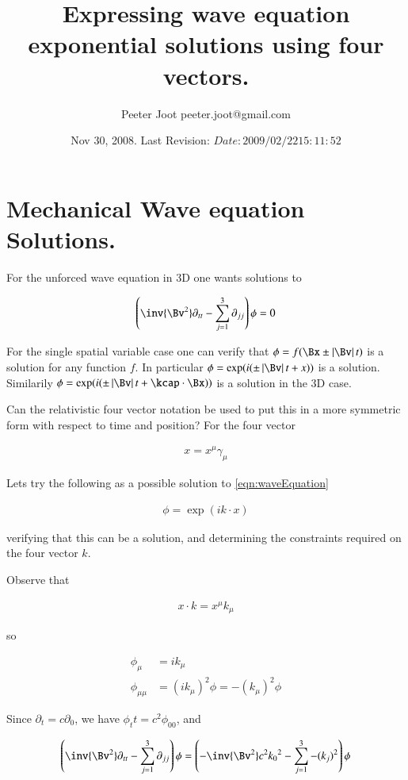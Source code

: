 \documentclass{article}
\title{ Expressing wave equation exponential solutions using four vectors. }
\author{Peeter Joot \quad peeter.joot@gmail.com}
\date{ Nov 30, 2008.  Last Revision: $Date: 2009/02/22 15:11:52 $ }
\begin{document}
\maketitle{}

\section{ Mechanical Wave equation Solutions. }

For the unforced wave equation in 3D one wants solutions to

\begin{align}\label{eqn:waveEquation}
\left( \inv{\Bv^2} \partial_{tt} - \sum_{j=1}^3 \partial_{jj}\right) \phi = 0
\end{align}

For the single spatial variable case one can verify that 
$\phi = f( \Bx \pm \Abs{\Bv} t)$ is a solution for any function $f$.  In particular $\phi = \exp(i (\pm \Abs{\Bv} t + x))$ is a solution.  Similarily
$\phi = \exp(i (\pm \Abs{\Bv} t + \kcap \cdot \Bx))$ is a solution in the 3D case.

Can the relativistic four vector notation be used to put this in a more symmetric form with respect to time and position?  For the four
vector

\begin{align*}
x = x^\mu \gamma_\mu
\end{align*}

Lets try the following as a possible solution to \ref{eqn:waveEquation}

\begin{align*}
\phi = \exp(i k \cdot x)
\end{align*}

verifying that this can be a solution, and determining the constraints required on the four vector $k$.

Observe that

\begin{align*}
x \cdot k = x^\mu k_\mu
\end{align*}

so

\begin{align*}
\phi_\mu &= i k_\mu \\
\phi_{\mu\mu} &= (i k_\mu)^2 \phi = -(k_\mu)^2 \phi
\end{align*}

Since $\partial_t = c\partial_0$, we have $\phi_tt = c^2 \phi_{00}$, and

\begin{align*}
\left( \inv{\Bv^2} \partial_{tt} - \sum_{j=1}^3 \partial_{jj}\right) \phi &= 
\left( -\inv{\Bv^2} c^2 {k_0}^2 - \sum_{j=1}^3 -(k_j)^2\right) \phi \\ 
\end{align*}
\end{document}

